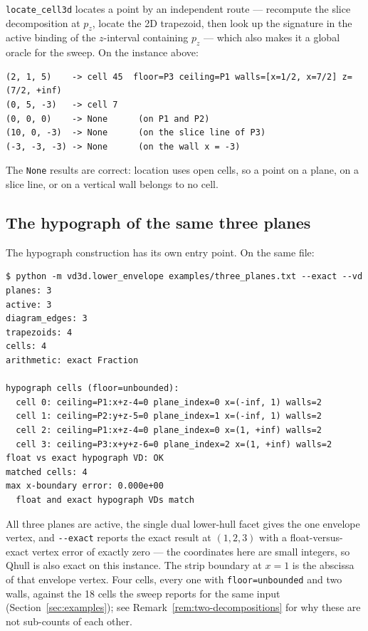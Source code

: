 \documentclass[11pt]{article}
\begin{document}
\texttt{locate\_cell3d} locates a point by an independent route --- recompute
the slice decomposition at $p_z$, locate the 2D trapezoid, then look up the
signature in the active binding of the $z$-interval containing $p_z$ --- which
also makes it a global oracle for the sweep.  On the instance above:

\begin{lstlisting}
(2, 1, 5)    -> cell 45  floor=P3 ceiling=P1 walls=[x=1/2, x=7/2] z=(7/2, +inf)
(0, 5, -3)   -> cell 7
(0, 0, 0)    -> None      (on P1 and P2)
(10, 0, -3)  -> None      (on the slice line of P3)
(-3, -3, -3) -> None      (on the wall x = -3)
\end{lstlisting}

The \texttt{None} results are correct: location uses open cells, so a point on
a plane, on a slice line, or on a vertical wall belongs to no cell.

\subsection{The hypograph of the same three planes}

The hypograph construction has its own entry point.  On the same file:

\begin{lstlisting}
$ python -m vd3d.lower_envelope examples/three_planes.txt --exact --vd
planes: 3
active: 3
diagram_edges: 3
trapezoids: 4
cells: 4
arithmetic: exact Fraction

hypograph cells (floor=unbounded):
  cell 0: ceiling=P1:x+z-4=0 plane_index=0 x=(-inf, 1) walls=2
  cell 1: ceiling=P2:y+z-5=0 plane_index=1 x=(-inf, 1) walls=2
  cell 2: ceiling=P1:x+z-4=0 plane_index=0 x=(1, +inf) walls=2
  cell 3: ceiling=P3:x+y+z-6=0 plane_index=2 x=(1, +inf) walls=2
float vs exact hypograph VD: OK
matched cells: 4
max x-boundary error: 0.000e+00
  float and exact hypograph VDs match
\end{lstlisting}

All three planes are active, the single dual lower-hull facet gives the one
envelope vertex, and \verb|--exact| reports the exact result at
$(1,2,3)$ with a float-versus-exact vertex error of exactly zero --- the
coordinates here are small integers, so Qhull is also exact on this instance.
The strip boundary at $x = 1$ is the abscissa of that envelope vertex.  Four
cells, every one with \verb|floor=unbounded| and two walls, against the 18 cells
the sweep reports for the same input (Section~\ref{sec:examples}); see
Remark~\ref{rem:two-decompositions} for why these are not sub-counts of each
other.
\end{document}
